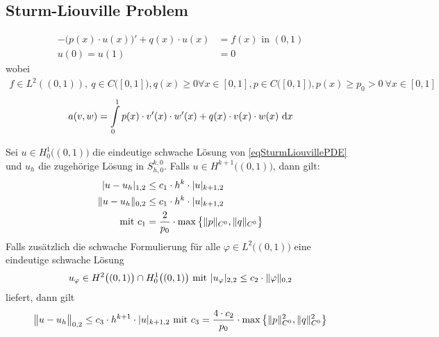 \subsection*{Sturm-Liouville Problem}
\begin{align}\label{eqSturmLiouvillePDE}\tag{SturmLiouville}
-\big(p(x)\cdot u(x)\big)'+q(x)\cdot u(x) &= f(x) \text{ in } (0,1)\\\nonumber
u(0)=u(1)&=0
\end{align}
wobei
\begin{align*}
f\in L^2((0,1)),~q\in C\big([0,1]\big), q(x)\geq0\forall x\in[0,1], p\in C\big([0,1]\big), p(x)\geq p_0>0~\forall x\in [0,1]
\end{align*}
\begin{align*}
a(v,w)=\int\limits_0^1 p(x)\cdot v'(x)\cdot w'(x)+q(x)\cdot v(x)\cdot w(x)\d x
\end{align*}

\begin{theorem}\label{theorem4.4}
Sei $u\in H^1_0\big((0,1)\big)$ die eindeutige schwache Lösung von \eqref{eqSturmLiouvillePDE} und $u_h$ die zugehörige Lösung in $S_{h,0}^{k,0}$.
Falls $u\in H^{k+1}\big((0,1)\big)$, dann gilt:
\begin{align*}
|u-u_h|_{1,2}&\leq c_1\cdot h^k\cdot |u|_{k+1,2}\\
\Vert u-u_h\Vert_{0,2}&\leq c_1\cdot h^k\cdot |u|_{k+1,2}\\
\mit c_1&=\frac{2}{p_0}\cdot\max\limits\big\lbrace \Vert p\Vert_{C^0},\Vert q\Vert_{C^0}\big\rbrace
\end{align*}
Falls zusätzlich die schwache Formulierung für alle $\varphi\in L^2\big((0,1)\big)$ eine eindeutige schwache Lösung 
\begin{align*}
u_\varphi\in H^2\big((0,1)\big)\cap H^1_0\big((0,1)\big)\mit |u_\varphi|_{2,2}\leq c_2\cdot\Vert \varphi\Vert_{0,2}
\end{align*}
liefert, dann gilt
\begin{align*}
\big\Vert u-u_h\big\Vert_{0,2}\leq c_3\cdot h^{k+1}\cdot |u|_{k+1,2}
\mit c_3=\frac{4\cdot c_2}{p_0}\cdot\max\limits\left\lbrace\Vert p\Vert^2_{C^0},\Vert q\Vert^2_{C^0}\right\rbrace
\end{align*}
\end{theorem}


